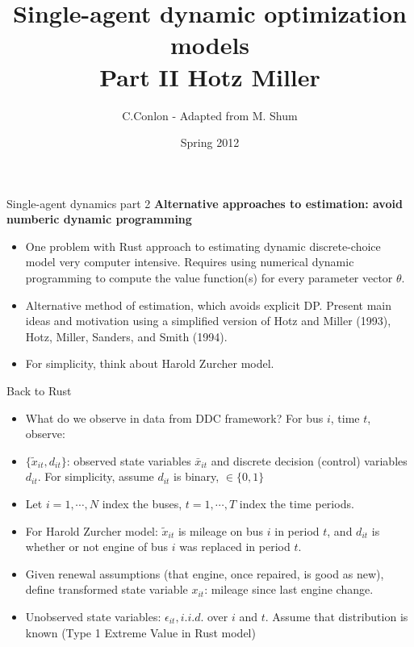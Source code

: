 \documentclass[xcolor=pdftex,dvipsnames,table,mathserif]{beamer}
\title [Single-agent dynamic optimization models]{Single-agent dynamic optimization models\\
Part II Hotz Miller}
\author{C.Conlon - Adapted from M. Shum}
\institute{Grad IO III}
\date{Spring 2012}
\begin{document}
\begin{frame}
\titlepage
\end{frame}


\begin{frame}{Single-agent dynamics part 2}
\textbf{Alternative approaches to estimation: avoid numberic dynamic programming} \\
\begin{itemize}
\item One problem with Rust approach to estimating dynamic discrete-choice model very computer intensive. Requires using numerical dynamic programming to compute the value function(s) for every parameter vector $\theta$.
\item Alternative method of estimation, which avoids explicit DP. Present main ideas and motivation using a simplified version of Hotz and Miller (1993), Hotz, Miller, Sanders, and Smith (1994). \\
\item For simplicity, think about Harold Zurcher model.
\end{itemize}
\end{frame}


\begin{frame}{Back to Rust}
\begin{itemize}
\item What do we observe in data from DDC framework? For bus $i$, time $t$, observe:
\item $\{ \tilde x_{it}, d_{it}\}$: observed state variables $\bar x_{it}$ and discrete decision (control) variables $d_{it}$. For simplicity, assume $d_{it}$ is binary, $\in \{0,1\}$
\item Let $i=1, \cdots , N$ index the buses, $t=1, \cdots, T$ index the time periods. 
\item For Harold Zurcher model: $\tilde x_{it}$ is mileage on bus $i$ in period $t$, and $d_{it}$ is whether or not engine of bus $i$ was replaced in period $t$. 
\item Given renewal assumptions (that engine, once repaired, is good as new), define transformed state variable $x_{it}$: mileage since last engine change. 
\item Unobserved state variables: $\epsilon_{it}, i.i.d.$ over $i$ and $t$. Assume that distribution is known (Type 1 Extreme Value in Rust model)
\end{itemize}
\end{frame}
\end{document}
